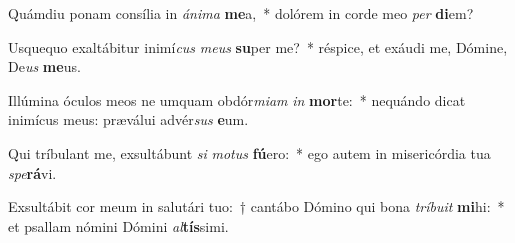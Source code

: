 \item Quámdiu ponam consília in \textit{á}\textit{ni}\textit{ma} \textbf{me}a,~* dolórem in corde meo \textit{per} \textbf{di}em?
\item Usquequo exaltábitur inimí\textit{cus} \textit{me}\textit{us} \textbf{su}per me?~* réspice, et exáudi me, Dómine, De\textit{us} \textbf{me}us.
\item Illúmina óculos meos ne umquam obdór\textit{mi}\textit{am} \textit{in} \textbf{mor}te:~* nequándo dicat inimícus meus: præválui advér\textit{sus} \textbf{e}um.
\item Qui tríbulant me, exsultábunt \textit{si} \textit{mo}\textit{tus} \textbf{fú}ero:~* ego autem in misericórdia tua \textit{spe}\textbf{rá}vi.
\item Exsultábit cor meum in salutári tuo:~† cantábo Dómino qui bona \textit{trí}\textit{bu}\textit{it} \textbf{mi}hi:~* et psallam nómini Dómini \textit{al}\textbf{tís}simi.
